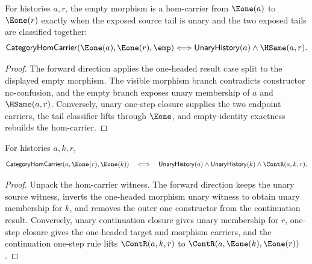 \begin{theorem}
\label{thm:category-hom-carrier-e1-source-e1-target-empty-morphism-iff}
For histories $a,r$, the empty morphism is a hom-carrier from $\Eone(a)$ to
$\Eone(r)$ exactly when the exposed source tail is unary and the two exposed
tails are classified together:
$$
\mathsf{CategoryHomCarrier}(\Eone(a),\Eone(r),\emp)
\Longleftrightarrow
\mathsf{UnaryHistory}(a)\land\HSame(a,r).
$$
\end{theorem}
\begin{proof}
The forward direction applies the one-headed result case split to the displayed
empty morphism. The visible morphism branch contradicts constructor
no-confusion, and the empty branch exposes unary membership of $a$ and
$\HSame(a,r)$. Conversely, unary one-step closure supplies the two endpoint
carriers, the tail classifier lifts through $\Eone$, and empty-identity
exactness rebuilds the hom-carrier.
\end{proof}

\begin{theorem}
\label{thm:category-hom-carrier-e1-morphism-target-iff}
For histories $a,k,r$,
$$
\mathsf{CategoryHomCarrier}(a,\Eone(r),\Eone(k))
\quad\Longleftrightarrow\quad
\mathsf{UnaryHistory}(a)\land \mathsf{UnaryHistory}(k)\land \ContR(a,k,r).
$$
\end{theorem}
\begin{proof}
Unpack the hom-carrier witness. The forward direction keeps the unary source
witness, inverts the one-headed morphism unary witness to obtain unary
membership for $k$, and removes the outer one constructor from the
continuation result. Conversely, unary continuation closure gives unary
membership for $r$, one-step closure gives the one-headed target and morphism
carriers, and the continuation one-step rule lifts $\ContR(a,k,r)$ to
$\ContR(a,\Eone(k),\Eone(r))$.
\end{proof}

